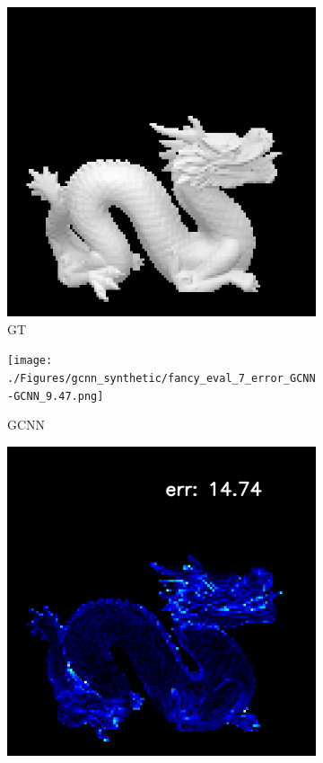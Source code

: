 \begin{figure}[H]
	\begin{subfigure}[b]{0.24\linewidth}
		\includegraphics[width=\linewidth]{./Figures/gcnn_synthetic/fancy_eval_7_img.png}
		\caption{GT}
	\end{subfigure}
	\begin{subfigure}[b]{0.24\linewidth}
		\texttt{[image: ./Figures/gcnn\_synthetic/fancy\_eval\_7\_error\_GCNN-GCNN\_9.47.png]}
		\caption{GCNN}
	\end{subfigure}
	\begin{subfigure}[b]{0.24\linewidth}
		\includegraphics[width=\linewidth]{./Figures/gcnn_synthetic/fancy_eval_7_error_GCNN-NOC.png}

\end{subfigure}
\end{figure}
